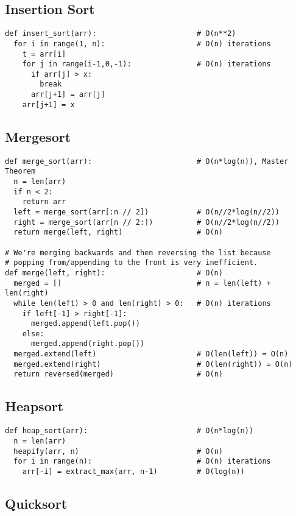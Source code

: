 \documentclass{article}
\begin{document}
\subsection{Insertion Sort}

\begin{verbatim}
def insert_sort(arr):                       # O(n**2)
  for i in range(1, n):                     # O(n) iterations
    t = arr[i]
    for j in range(i-1,0,-1):               # O(n) iterations
      if arr[j] > x:
        break
      arr[j+1] = arr[j]
    arr[j+1] = x
\end{verbatim}

\subsection{Mergesort}

\begin{verbatim}
def merge_sort(arr):                        # O(n*log(n)), Master Theorem
  n = len(arr)
  if n < 2:
    return arr
  left = merge_sort(arr[:n // 2])           # O(n//2*log(n//2))
  right = merge_sort(arr[n // 2:])          # O(n//2*log(n//2))
  return merge(left, right)                 # O(n)

# We're merging backwards and then reversing the list because
# popping from/appending to the front is very inefficient.
def merge(left, right):                     # O(n)
  merged = []                               # n = len(left) + len(right)
  while len(left) > 0 and len(right) > 0:   # O(n) iterations
    if left[-1] > right[-1]:
      merged.append(left.pop())
    else:
      merged.append(right.pop())
  merged.extend(left)                       # O(len(left)) = O(n)
  merged.extend(right)                      # O(len(right)) = O(n)
  return reversed(merged)                   # O(n)
\end{verbatim}

\subsection{Heapsort}

\begin{verbatim}
def heap_sort(arr):                         # O(n*log(n))
  n = len(arr)
  heapify(arr, n)                           # O(n)
  for i in range(n):                        # O(n) iterations
    arr[-i] = extract_max(arr, n-1)         # O(log(n))
\end{verbatim}

\subsection{Quicksort}
\end{document}
